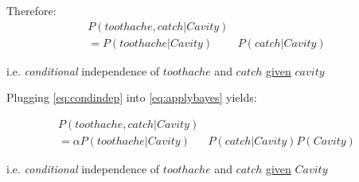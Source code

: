 \begin{frame}


Therefore:\slidesonly{\\ \vspace{-5mm}}
\begin{align}
P(\mathit{toothache}
, \mathit{catch}
 | \mathit{Cavity}) &\\
= P(\mathit{toothache}
| \mathit{Cavity}) &P(\mathit{catch}
| \mathit{Cavity})
\label{eq:condindep}
\end{align}

i.e. \emph{conditional} independence of $\mathit{toothache}$ and $\mathit{catch}$ \underline{given} $\mathit{cavity}$

\pause

Plugging \eqref{eq:condindep} into \eqref{eq:applybayes} yields:

\slidesonly{\vspace{-4mm}}

\begin{align}
P(\mathit{toothache}, \mathit{catch} | \mathit{Cavity}) &\\
= \alpha P(\mathit{toothache}| \mathit{Cavity}) &
P(\mathit{catch}| \mathit{Cavity}) P(\mathit{Cavity})
\end{align}

i.e. \emph{conditional} independence of $\mathit{toothache}$ and $\mathit{catch}$ \underline{given} $\mathit{Cavity}$
\end{frame}

